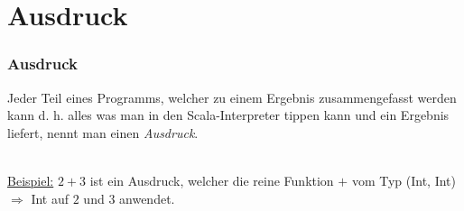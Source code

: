 	\section[Section]{Ausdruck}
		\begin{frame}
			\frametitle{Ausdruck}
			\begin{definition}[Ausdruck]
				Jeder Teil eines Programms, welcher zu einem Ergebnis 								zusammengefasst werden kann d. h. alles was man in den 
				Scala-Interpreter tippen kann und ein Ergebnis liefert,
				nennt man einen \emph{Ausdruck}.
		\end{definition} 
		\leavevmode \\
		\underline{Beispiel:} $2+3$ ist ein Ausdruck, welcher die reine Funktion
		$+$  vom Typ (Int, Int) $\Rightarrow$ Int auf $2$ und $3$ anwendet.
		\end{frame}